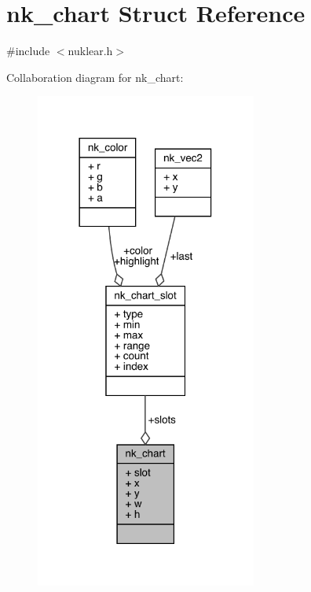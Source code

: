 \hypertarget{structnk__chart}{}\section{nk\+\_\+chart Struct Reference}
\label{structnk__chart}


{\ttfamily \#include $<$nuklear.\+h$>$}



Collaboration diagram for nk\+\_\+chart\+:
\nopagebreak
\begin{figure}[H]
\begin{center}
\leavevmode
\includegraphics[width=206pt]{structnk__chart__coll__graph}
\end{center}
\end{figure}
